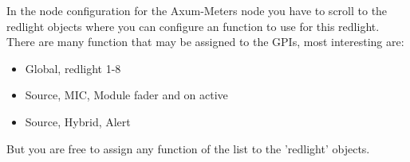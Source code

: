 \vspace{5mm}

In the node configuration for the Axum-Meters node you have to scroll to the redlight objects where you can configure an function to use for this redlight.
There are many function that may be assigned to the GPIs, most interesting are:
\begin{itemize}
\item Global, redlight 1-8
\item Source, MIC, Module fader and on active
\item Source, Hybrid, Alert
\end{itemize}

But you are free to assign any function of the list to the 'redlight' objects.


